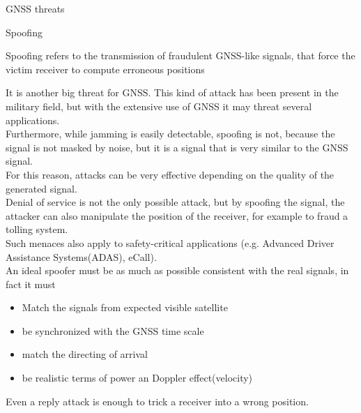 \begin{section}{GNSS threats}
    \begin{subsection}{Spoofing}
      \begin{boxH}
         Spoofing refers to the transmission of fraudulent GNSS-like signals, that force the
         victim receiver to compute erroneous positions
      \end{boxH}
      It is another big threat for GNSS. This kind of attack has been present in the military 
      field, but with the extensive use of GNSS it may threat several applications.\\

      Furthermore, while jamming is easily detectable, spoofing is not, because the signal is
      not masked by noise, but it is a signal that is very similar to the GNSS signal.\\
      For this reason, attacks can be very effective depending on the quality of the generated 
      signal.\\

      Denial of service is not the only possible attack, but by spoofing the signal, the attacker
      can also manipulate the position of the receiver, for example to fraud a tolling system.\\
      Such menaces also apply to safety-critical applications (e.g. Advanced Driver Assistance 
      Systems(ADAS), eCall).\\

      An ideal spoofer must be as much as possible consistent with the real signals, in fact it must
      \begin{itemize}
        \item Match the signals from expected visible satellite
        \item be synchronized with the GNSS time scale
        \item match the directing of arrival
        \item be realistic terms of power an Doppler effect(velocity)
      \end{itemize}
      Even a reply attack is enough to trick a receiver into a wrong position.\\


\end{subsection}
\end{section}

